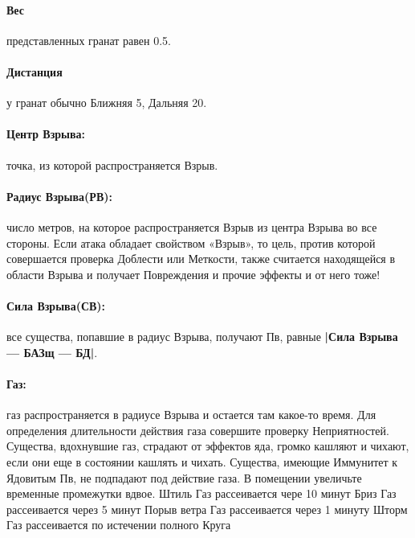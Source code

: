 \paragraph{Вес} представленных гранат равен 0.5.
\paragraph{Дистанция} у гранат обычно Ближняя 5, Дальняя 20.
\paragraph{Центр Взрыва:} точка, из которой распространяется Взрыв.
\paragraph{Радиус Взрыва(РВ):} число метров, на которое распространяется Взрыв из центра Взрыва во все стороны. Если атака обладает свойством «Взрыв», то цель, против которой совершается проверка Доблести или Меткости, также считается находящейся в области Взрыва и получает Повреждения и прочие эффекты и от него тоже!
\paragraph{Сила Взрыва(СВ):} все существа, попавшие в радиус Взрыва, получают Пв, равные \textbf{|Сила Взрыва — БАЗщ — БД|}.
\paragraph{Газ:} газ распространяется в радиусе Взрыва и остается там какое-то время. Для определения длительности действия газа совершите проверку Неприятностей. Существа, вдохнувшие газ, страдают от эффектов яда, громко кашляют и чихают, если они еще в состоянии кашлять и чихать. Существа, имеющие Иммунитет к Ядовитым Пв, не подпадают под действие газа. В помещении увеличьте временные промежутки вдвое.
\trouble
{Штиль}%
{Газ рассеивается чере 10 минут}%
{Бриз}%
{Газ рассеивается через 5 минут}%
{Порыв ветра}%
{Газ рассеивается через 1 минуту}%
{Шторм}%
{Газ рассеивается по истечении полного Круга}%

